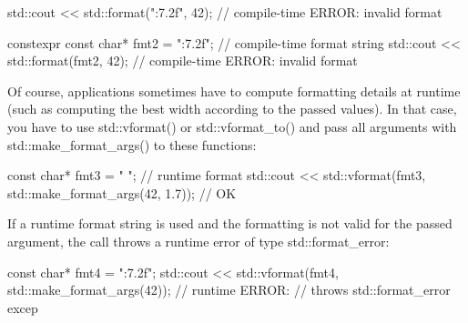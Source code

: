 \begin{cpp}
std::cout << std::format("{:7.2f}\n", 42); // compile-time ERROR: invalid format

constexpr const char* fmt2 = "{:7.2f}\n"; // compile-time format string
std::cout << std::format(fmt2, 42); // compile-time ERROR: invalid format
\end{cpp}

Of course, applications sometimes have to compute formatting details at runtime (such as computing the best width according to the passed values). In that case, you have to use std::vformat() or std::vformat\_to() and pass all arguments with std::make\_format\_args() to these functions:

\begin{cpp}
const char* fmt3 = "{} {}\n"; // runtime format
std::cout << std::vformat(fmt3, std::make_format_args(42, 1.7)); // OK
\end{cpp}

If a runtime format string is used and the formatting is not valid for the passed argument, the call throws a runtime error of type std::format\_error:

\begin{cpp}
const char* fmt4 = "{:7.2f}\n";
std::cout << std::vformat(fmt4, std::make_format_args(42)); // runtime ERROR:
// throws std::format_error excep
\end{cpp}


